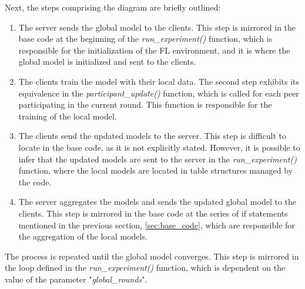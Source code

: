 Next, the steps comprising the diagram are briefly outlined:
\begin{enumerate}
        \item The server sends the global model to the clients. This step is mirrored in the base code at the beginning of the \textit{run\_experiment()} function, which is responsible for the initialization of the FL environment, and it is where the global model is initialized and sent to the clients.
        \item The clients train the model with their local data. The second step exhibits its equivalence in the \textit{participant\_update()} function, which is called for each peer participating in the current round. This function is responsible for the training of the local model.
        \item The clients send the updated models to the server. This step is difficult to locate in the base code, as it is not explicitly stated. However, it is possible to infer that the updated models are sent to the server in the \textit{run\_experiment()} function, where the local models are located in table structures managed by the code.
        \item The server aggregates the models and sends the updated global model to the clients. This step is mirrored in the base code at the series of if statements mentioned in the previous section, \ref{sec:base_code}, which are responsible for the aggregation of the local models.
\end{enumerate}
The process is repeated until the global model converges. This step is mirrored in the loop defined in the \textit{run\_experiment()} function, which is dependent on the value of the parameter "\textit{global\_rounds}".


\pagebreak